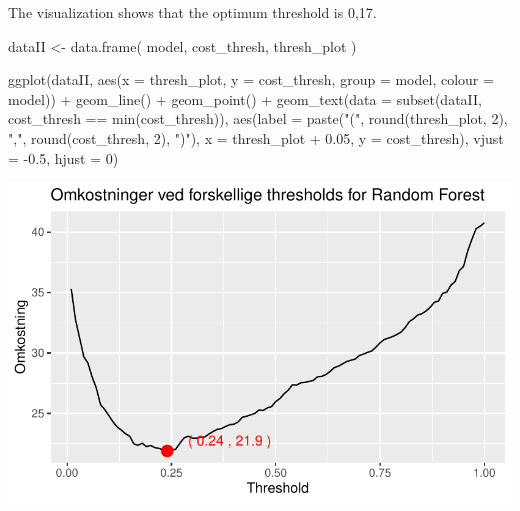 \documentclass[
  letterpaper,
  DIV=11,
  numbers=noendperiod]{scrartcl}
\newenvironment{Shaded}{\begin{snugshade}}{\end{snugshade}}
\newcommand{\AttributeTok}[1]{\textcolor[rgb]{0.40,0.45,0.13}{#1}}
\newcommand{\DecValTok}[1]{\textcolor[rgb]{0.68,0.00,0.00}{#1}}
\newcommand{\FloatTok}[1]{\textcolor[rgb]{0.68,0.00,0.00}{#1}}
\newcommand{\FunctionTok}[1]{\textcolor[rgb]{0.28,0.35,0.67}{#1}}
\newcommand{\NormalTok}[1]{\textcolor[rgb]{0.00,0.23,0.31}{#1}}
\newcommand{\OtherTok}[1]{\textcolor[rgb]{0.00,0.23,0.31}{#1}}
\newcommand{\SpecialCharTok}[1]{\textcolor[rgb]{0.37,0.37,0.37}{#1}}
\newcommand{\StringTok}[1]{\textcolor[rgb]{0.13,0.47,0.30}{#1}}
\begin{document}
The visualization shows that the optimum threshold is 0,17.

\begin{Shaded}
\begin{Highlighting}[]
\NormalTok{dataII }\OtherTok{\textless{}{-}} \FunctionTok{data.frame}\NormalTok{(}
\NormalTok{  model,}
\NormalTok{  cost\_thresh,}
\NormalTok{  thresh\_plot}
\NormalTok{)}

\FunctionTok{ggplot}\NormalTok{(dataII, }\FunctionTok{aes}\NormalTok{(}\AttributeTok{x =}\NormalTok{ thresh\_plot, }\AttributeTok{y =}\NormalTok{ cost\_thresh, }\AttributeTok{group =}\NormalTok{ model, }\AttributeTok{colour =}\NormalTok{ model)) }\SpecialCharTok{+}
  \FunctionTok{geom\_line}\NormalTok{() }\SpecialCharTok{+}
  \FunctionTok{geom\_point}\NormalTok{() }\SpecialCharTok{+}
  \FunctionTok{geom\_text}\NormalTok{(}\AttributeTok{data =} \FunctionTok{subset}\NormalTok{(dataII, cost\_thresh }\SpecialCharTok{==} \FunctionTok{min}\NormalTok{(cost\_thresh)), }
            \FunctionTok{aes}\NormalTok{(}\AttributeTok{label =} \FunctionTok{paste}\NormalTok{(}\StringTok{"("}\NormalTok{, }\FunctionTok{round}\NormalTok{(thresh\_plot, }\DecValTok{2}\NormalTok{), }\StringTok{","}\NormalTok{, }\FunctionTok{round}\NormalTok{(cost\_thresh, }\DecValTok{2}\NormalTok{), }\StringTok{")"}\NormalTok{), }
                \AttributeTok{x =}\NormalTok{ thresh\_plot }\SpecialCharTok{+} \FloatTok{0.05}\NormalTok{, }\AttributeTok{y =}\NormalTok{ cost\_thresh), }
            \AttributeTok{vjust =} \SpecialCharTok{{-}}\FloatTok{0.5}\NormalTok{, }\AttributeTok{hjust =} \DecValTok{0}\NormalTok{)}
\end{Highlighting}
\end{Shaded}

\includegraphics{index_files/figure-pdf/unnamed-chunk-15-1.pdf}
\end{document}
